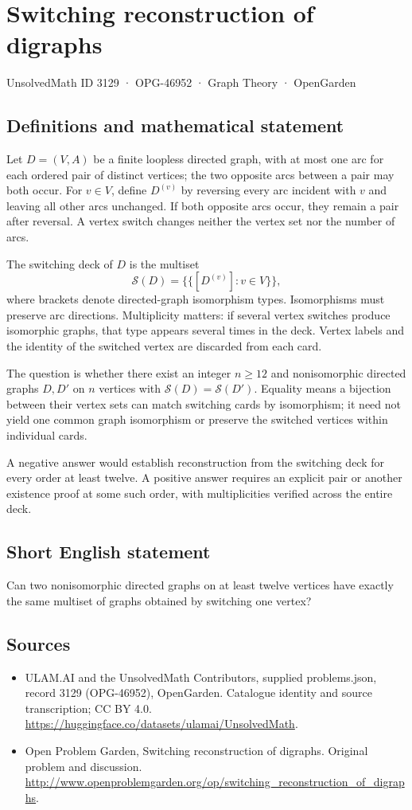 \documentclass[11pt,a4paper]{article}
\begin{document}
\section*{Switching reconstruction of digraphs}\label{3129}
{\small UnsolvedMath ID 3129 · OPG-46952 · Graph Theory · OpenGarden}
\subsection{Definitions and mathematical statement}
Let $D=(V,A)$ be a finite loopless directed graph, with at most one arc for each ordered pair of distinct vertices; the two opposite arcs between a pair may both occur. For $v\in V$, define $D^{(v)}$ by reversing every arc incident with $v$ and leaving all other arcs unchanged. If both opposite arcs occur, they remain a pair after reversal. A vertex switch changes neither the vertex set nor the number of arcs.

The switching deck of $D$ is the multiset
\[
 \mathcal S(D)=\{\!\{[D^{(v)}]:v\in V\}\!\},
\]
where brackets denote directed-graph isomorphism types. Isomorphisms must preserve arc directions. Multiplicity matters: if several vertex switches produce isomorphic graphs, that type appears several times in the deck. Vertex labels and the identity of the switched vertex are discarded from each card.

The question is whether there exist an integer $n\ge12$ and nonisomorphic directed graphs $D,D'$ on $n$ vertices with $\mathcal S(D)=\mathcal S(D')$. Equality means a bijection between their vertex sets can match switching cards by isomorphism; it need not yield one common graph isomorphism or preserve the switched vertices within individual cards.

A negative answer would establish reconstruction from the switching deck for every order at least twelve. A positive answer requires an explicit pair or another existence proof at some such order, with multiplicities verified across the entire deck.
\subsection{Short English statement}
Can two nonisomorphic directed graphs on at least twelve vertices have exactly the same multiset of graphs obtained by switching one vertex?
\subsection{Sources}
\begin{itemize}
\item[S1] ULAM.AI and the UnsolvedMath Contributors, supplied problems.json, record 3129 (OPG-46952), OpenGarden. Catalogue identity and source transcription; CC BY 4.0.
\url{https://huggingface.co/datasets/ulamai/UnsolvedMath}.
\item[S2] Open Problem Garden, Switching reconstruction of digraphs. Original problem and discussion.
\url{http://www.openproblemgarden.org/op/switching_reconstruction_of_digraphs}.
\end{itemize}
\end{document}

